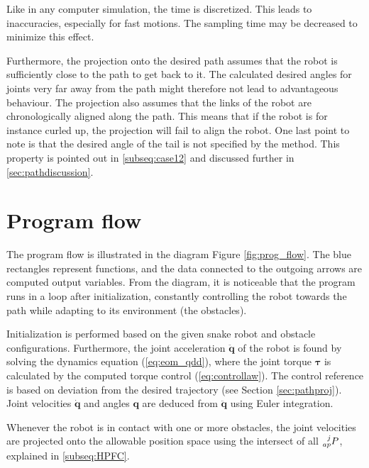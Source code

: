 Like in any computer simulation, the time is discretized. This leads to inaccuracies, especially for fast motions. The sampling time may be decreased to minimize this effect.

Furthermore, the projection onto the desired path assumes that the robot is sufficiently close to the path to get back to it. The calculated desired angles for joints very far away from the path might therefore not lead to advantageous behaviour. The projection also assumes that the links of the robot are chronologically aligned along the path. This means that if the robot is for instance curled up, the projection will fail to align the robot. One last point to note is that the desired angle of the tail is not specified by the method. This property is pointed out in \ref{subseq:case12} and discussed further in \ref{sec:pathdiscussion}.



\section{Program flow}

The program flow is illustrated in the diagram Figure \ref{fig:prog_flow}. The blue rectangles represent functions, and the data connected to the outgoing arrows are computed output variables. From the diagram, it is noticeable that the program runs in a loop after initialization, constantly controlling the robot towards the path while adapting to its environment (the obstacles).

Initialization is performed based on the given snake robot and obstacle configurations. Furthermore, the joint acceleration $\mathbf{\ddot{q}}$ of the robot is found by solving the dynamics equation (\ref{eq:eom_qdd}), where the joint torque $\boldsymbol{\tau}$ is calculated by the computed torque control (\ref{eq:controllaw}). The control reference is based on deviation from the desired trajectory (see Section \ref{sec:pathproj}). Joint velocities $\mathbf{\dot{q}}$ and angles $\mathbf{q}$ are deduced from $\mathbf{\ddot{q}}$ using Euler integration.

Whenever the robot is in contact with one or more obstacles, the joint velocities are projected onto the allowable position space using the intersect of all $\prescript{j}{ap}{P}$, explained in \ref{subseq:HPFC}.

